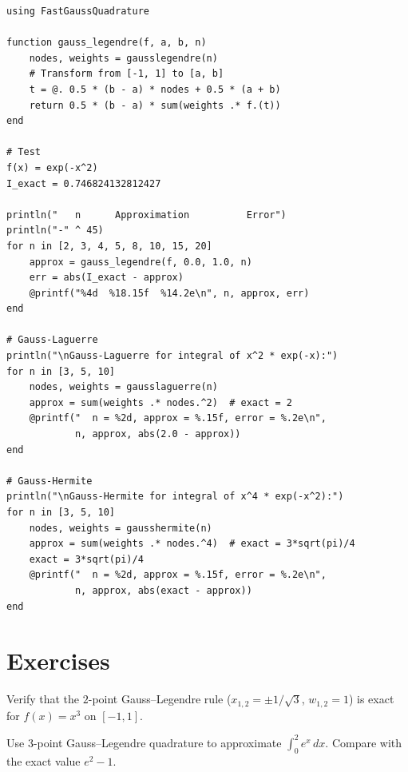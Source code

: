 \begin{codeblock}[title=\textbf{Julia --- Gauss--Legendre quadrature with FastGaussQuadrature}]
\begin{verbatim}
using FastGaussQuadrature

function gauss_legendre(f, a, b, n)
    nodes, weights = gausslegendre(n)
    # Transform from [-1, 1] to [a, b]
    t = @. 0.5 * (b - a) * nodes + 0.5 * (a + b)
    return 0.5 * (b - a) * sum(weights .* f.(t))
end

# Test
f(x) = exp(-x^2)
I_exact = 0.746824132812427

println("   n      Approximation          Error")
println("-" ^ 45)
for n in [2, 3, 4, 5, 8, 10, 15, 20]
    approx = gauss_legendre(f, 0.0, 1.0, n)
    err = abs(I_exact - approx)
    @printf("%4d  %18.15f  %14.2e\n", n, approx, err)
end

# Gauss-Laguerre
println("\nGauss-Laguerre for integral of x^2 * exp(-x):")
for n in [3, 5, 10]
    nodes, weights = gausslaguerre(n)
    approx = sum(weights .* nodes.^2)  # exact = 2
    @printf("  n = %2d, approx = %.15f, error = %.2e\n",
            n, approx, abs(2.0 - approx))
end

# Gauss-Hermite
println("\nGauss-Hermite for integral of x^4 * exp(-x^2):")
for n in [3, 5, 10]
    nodes, weights = gausshermite(n)
    approx = sum(weights .* nodes.^4)  # exact = 3*sqrt(pi)/4
    exact = 3*sqrt(pi)/4
    @printf("  n = %2d, approx = %.15f, error = %.2e\n",
            n, approx, abs(exact - approx))
end
\end{verbatim}
\end{codeblock}

\section{Exercises}

\begin{exercise}[$\star$]
\label{ex:ch8-gl2}
Verify that the $2$-point Gauss--Legendre rule ($x_{1,2} = \pm 1/\sqrt{3}$, $w_{1,2} = 1$) is exact for $f(x) = x^3$ on $[-1,1]$.
\end{exercise}

\begin{exercise}[$\star$]
\label{ex:ch8-interval}
Use 3-point Gauss--Legendre quadrature to approximate $\int_0^2 e^x\,dx$. Compare with the exact value $e^2 - 1$.
\end{exercise}

